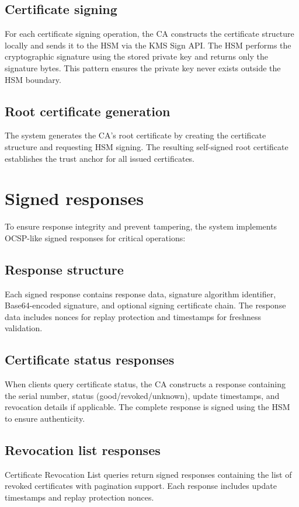 \subsection{Certificate signing}
For each certificate signing operation, the CA 
constructs the certificate structure locally and sends it to the HSM via the 
KMS Sign API. The HSM performs the cryptographic signature using the stored 
private key and returns only the signature bytes. This pattern ensures the 
private key never exists outside the HSM boundary.

\subsection{Root certificate generation}
The system generates the CA's root certificate 
by creating the certificate structure and requesting HSM signing. The resulting 
self-signed root certificate establishes the trust anchor for all issued certificates.

\section{Signed responses}

To ensure response integrity and prevent tampering, the system implements 
OCSP-like signed responses for critical operations:

\subsection{Response structure}
Each signed response contains response data, 
signature algorithm identifier, Base64-encoded signature, and optional signing 
certificate chain. The response data includes nonces for replay protection 
and timestamps for freshness validation.

\subsection{Certificate status responses}
When clients query certificate status, 
the CA constructs a response containing the serial number, status (good/revoked/unknown), 
update timestamps, and revocation details if applicable. The complete response 
is signed using the HSM to ensure authenticity.

\subsection{Revocation list responses}
Certificate Revocation List queries return 
signed responses containing the list of revoked certificates with pagination 
support. Each response includes update timestamps and replay protection nonces.


